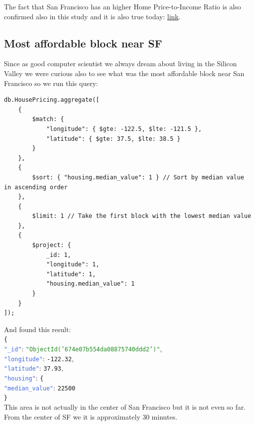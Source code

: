 \documentclass{Configuration_Files/PoliMi3i_thesis}
\newcommand{\jsonkey}[1]{\textcolor{RoyalBlue}{\texttt{"#1"}}}
\newcommand{\jsonstring}[1]{\textcolor{ForestGreen}{\texttt{"#1"}}}
\newcommand{\jsonnumber}[1]{\textcolor{BrickRed}{\texttt{#1}}}
\begin{document}
The fact that San Francisco has an higher Home Price-to-Income Ratio is also confirmed also in this study and it is also true today: \href{https://www.voronoiapp.com/real-estate/Los-Angeles-Has-The-Highest-Home-Price-to-Income-Ratio-In-The-US--2717?utm_source=chatgpt.com}{link}. 

\subsection{Most affordable block near SF}
Since as good computer scientist we always dream about living in the Silicon Valley we were curious also to see what was the most affordable block near San Francisco so we run this query: 
\begin{lstlisting}[language=MongoDB]
db.HousePricing.aggregate([
    {
        $match: {
            "longitude": { $gte: -122.5, $lte: -121.5 },
            "latitude": { $gte: 37.5, $lte: 38.5 }
        }
    },
    {
        $sort: { "housing.median_value": 1 } // Sort by median value in ascending order
    },
    {
        $limit: 1 // Take the first block with the lowest median value
    },
    {
        $project: {
            _id: 1,
            "longitude": 1,
            "latitude": 1,
            "housing.median_value": 1
        }
    }
]);
\end{lstlisting}
And found this result: \\ 
\noindent
\texttt{\{} \\
\jsonkey{\_id}: \jsonstring{ObjectId('674e07b554da08875740ddd2')}, \\
\jsonkey{longitude}: \jsonnumber{-122.32}, \\
\jsonkey{latitude}: \jsonnumber{37.93}, \\
\jsonkey{housing}: \texttt{\{} \\
\hspace*{1em} \jsonkey{median\_value}: \jsonnumber{22500} \\
\texttt{\}} \\

This area is not actually in the center of San Francisco but it  is not even so far. From the center of SF we it is approximately 30 minutes.
\end{document}
